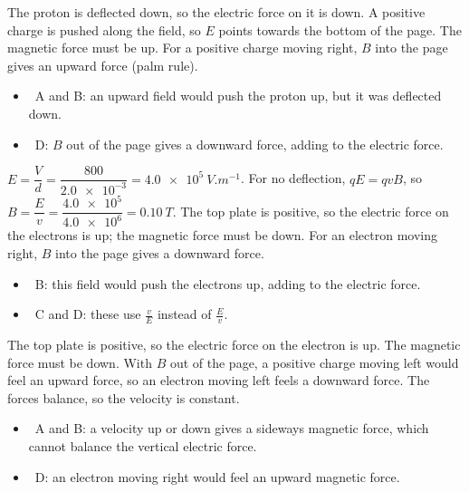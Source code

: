 \documentclass[12pt]{article}
\begin{document}
\begin{practiceanswers}
\begin{practiceans}
  The proton is deflected down, so the electric force on it is down. A positive charge is pushed along
  the field, so $E$ points towards the bottom of the page. The magnetic force must be up. For a positive
  charge moving right, $B$ into the page gives an upward force (palm rule).
  \begin{itemize}
    \item \xmark\ A and B: an upward field would push the proton up, but it was deflected down.
    \item \xmark\ D: $B$ out of the page gives a downward force, adding to the electric force.
  \end{itemize}
\end{practiceans}

\begin{practiceans}
  $E = \dfrac{V}{d} = \dfrac{800}{\num{2.0e-3}} = \qty{4.0e5}{V.m^{-1}}$. For no deflection,
  $qE = qvB$, so $B = \dfrac{E}{v} = \dfrac{\num{4.0e5}}{\num{4.0e6}} = \qty{0.10}{T}$.
  The top plate is positive, so the electric force on the electrons is up; the magnetic force must be
  down. For an electron moving right, $B$ into the page gives a downward force.
  \begin{itemize}
    \item \xmark\ B: this field would push the electrons up, adding to the electric force.
    \item \xmark\ C and D: these use $\frac{v}{E}$ instead of $\frac{E}{v}$.
  \end{itemize}
\end{practiceans}

\begin{practiceans}
  The top plate is positive, so the electric force on the electron is up. The magnetic force must be
  down. With $B$ out of the page, a positive charge moving left would feel an upward force, so an
  electron moving left feels a downward force. The forces balance, so the velocity is constant.
  \begin{itemize}
    \item \xmark\ A and B: a velocity up or down gives a sideways magnetic force, which cannot balance
          the vertical electric force.
    \item \xmark\ D: an electron moving right would feel an upward magnetic force.
  \end{itemize}
\end{practiceans}


\end{practiceanswers}
\end{document}
